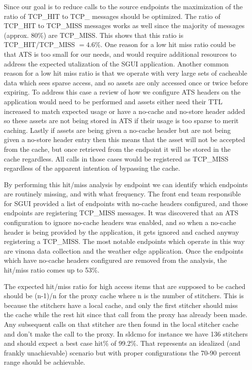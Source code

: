 \documentclass{article}
\begin{document}
Since our goal is to reduce calls to the source endpoints the maximization of the ratio of TCP\_HIT  to TCP\_ messages should be optimized. The ratio of TCP\_HIT to TCP\_MISS messages works as well since the majority of messages (approx. 80\%) are TCP\_MISS. This shows that this ratio is TCP\_HIT/TCP\_MISS $= 4.6\%$. One reason for a low hit miss ratio could be that ATS is too small for our needs, and would require additional resources to address the expected utalization of the SGUI application. Another common reason for a low hit miss ratio is that we operate with very large sets of cacheable data which sees sparse access, and so assets are only accessed once or twice before expiring. To address this case a review of how we configure ATS headers on the application would need to be performed and assets either need their TTL increased to match expected usage or have a no-cache and no-store header added so these assets are not being stored in ATS if their usage is too sparse to merit caching. Lastly if assets are being given a no-cache header but are not being given a no-store header entry then this means that the asset will not be accepted from the cache, but once retrieved from the endpoint it will be stored in the cache regardless. All calls in those cases would be registered as TCP\_MISS regardless of the apparent intention of bypassing the cache. 

By performing this hit/miss analysis by endpoint we can identify which endpoints are routinely missing, and with what frequency. The front end team responsible for SGUI provided a list of endpoints with no-cache headers configured, and those endpoints are registering TCP\_MISS messages. It was discovered that an ATS configuration to ignore no-cache headers was enabled, and so when a no-cache header is being provided by the application, it gets ignored and cached anyway registering a TCP\_MISS. The most notable endpoints which operate in this way are vinona data collection and the weather edge application. Once the endpoints which have no-cache headers configured are removed from the analysis, the hit/miss ratio comes up to 53\%. 

The expected hit/miss ratio for high access items that are supposed to be cached should be (n-1)/n for the proxy cache where n is the number of stitchers. This is because the stitchers have a local cache, and only the first stitcher should miss the cache while the rest hit since that call from the proxy has already been made. Any subsequent calls on that stitcher are then found in the local stitcher cache and don't make the call to the proxy. In sldcmo for instance we have 136 stitchers and should expect a best case hit\% of 99.2\%. That represents an idealized (and frankly unachievable) scenario but with proper configurations the 70-90 percent range should be achievable.
\end{document}
